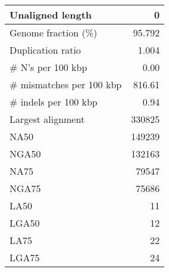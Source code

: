 \documentclass[12pt,a4paper]{article}
\begin{document}
\begin{table}[ht]
\begin{center}
\begin{tabular}{|l*{1}{|r}|}
Unaligned length & 0 \\ \hline
Genome fraction (\%) & 95.792 \\ \hline
Duplication ratio & 1.004 \\ \hline
\# N's per 100 kbp & 0.00 \\ \hline
\# mismatches per 100 kbp & 816.61 \\ \hline
\# indels per 100 kbp & 0.94 \\ \hline
Largest alignment & 330825 \\ \hline
NA50 & 149239 \\ \hline
NGA50 & 132163 \\ \hline
NA75 & 79547 \\ \hline
NGA75 & 75686 \\ \hline
LA50 & 11 \\ \hline
LGA50 & 12 \\ \hline
LA75 & 22 \\ \hline
LGA75 & 24 \\ \hline
\end{tabular}
\end{center}
\end{table}
\end{document}
